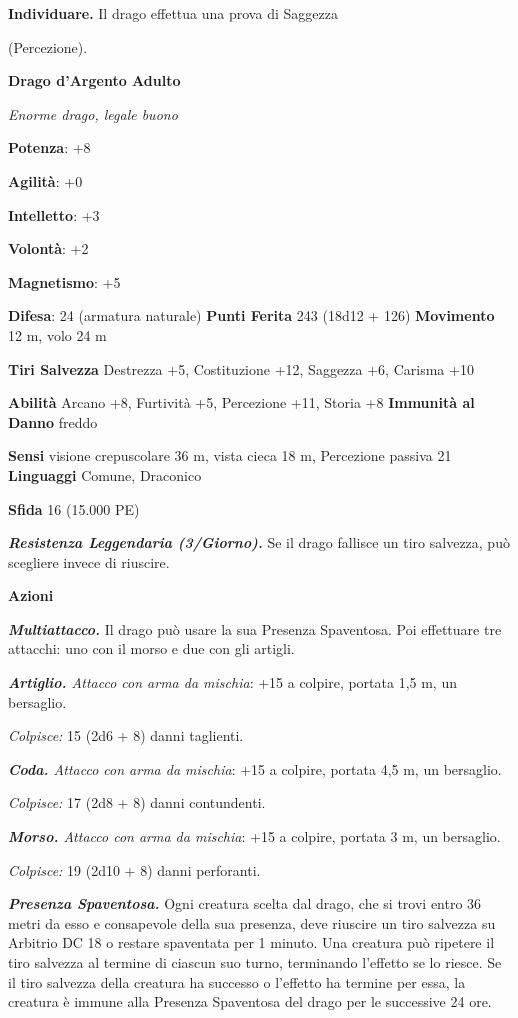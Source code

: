 \begin{multicols}{2}
\textbf{Individuare.} Il drago effettua una prova di Saggezza

(Percezione).



\textbf{Drago d'Argento Adulto}

\emph{Enorme drago, legale buono}

\textbf{Potenza}: +8

\textbf{Agilità}: +0

\textbf{Intelletto}: +3

\textbf{Volontà}: +2

\textbf{Magnetismo}: +5

\textbf{Difesa}: 24 (armatura naturale) \textbf{Punti Ferita}
243 (18d12 + 126) \textbf{Movimento} 12 m, volo 24 m

\textbf{Tiri Salvezza} Destrezza +5, Costituzione +12, Saggezza +6,
Carisma +10

\textbf{Abilità} Arcano +8, Furtività +5, Percezione +11, Storia +8
\textbf{Immunità al Danno} freddo

\textbf{Sensi} visione crepuscolare 36 m, vista cieca 18 m, Percezione passiva
21 \textbf{Linguaggi} Comune, Draconico

\textbf{Sfida} 16 (15.000 PE)

\emph{\textbf{Resistenza Leggendaria (3/Giorno).}} Se il drago fallisce
un tiro salvezza, può scegliere invece di riuscire.

\textbf{Azioni}

\emph{\textbf{Multiattacco.}} Il drago può usare la sua Presenza
Spaventosa. Poi effettuare tre attacchi: uno con il morso e due con gli
artigli.

\emph{\textbf{Artiglio.} Attacco con arma da mischia}: +15 a colpire,
portata 1,5 m, un bersaglio.

\emph{Colpisce:} 15 (2d6 + 8) danni taglienti.

\emph{\textbf{Coda.} Attacco con arma da mischia}: +15 a colpire,
portata 4,5 m, un bersaglio.

\emph{Colpisce:} 17 (2d8 + 8) danni contundenti.

\emph{\textbf{Morso.} Attacco con arma da mischia}: +15 a colpire,
portata 3 m, un bersaglio.

\emph{Colpisce:} 19 (2d10 + 8) danni perforanti.

\emph{\textbf{Presenza Spaventosa.}} Ogni creatura scelta dal drago, che
si trovi entro 36 metri da esso e consapevole della sua presenza, deve
riuscire un tiro salvezza su Arbitrio DC 18 o restare spaventata per 1
minuto. Una creatura può ripetere il tiro salvezza al termine di ciascun
suo turno, terminando l'effetto se lo riesce. Se il tiro salvezza della
creatura ha successo o l'effetto ha termine per essa, la creatura è
immune alla Presenza Spaventosa del drago per le successive 24 ore.


\end{multicols}
